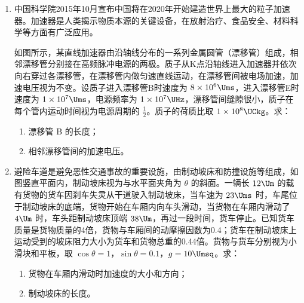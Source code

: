 \documentclass[\gkver]{gaokaozhenti}
\begin{document}
\begin{enumerate}
{\begin{enumerate}
	\item
	Ⅱ．（1）A、C；（2）C；（3）$ka$；$k-R_{2}$。

\end{enumerate}
}

\item
中国科学院2015年10月宣布中国将在2020年开始建造世界上最大的粒子加速器。加速器是人类揭示物质本源的关键设备，在放射治疗、食品安全、材料科学等方面有广泛应用。

如图所示，某直线加速器由沿轴线分布的一系列金属圆管（漂移管）组成，相邻漂移管分别接在高频脉冲电源的两极。质子从K点沿轴线进入加速器并依次向右穿过各漂移管，在漂移管内做匀速直线运动，在漂移管间被电场加速，加速电压视为不变。设质子进入漂移管B时速度为 $8\times10^{6}\Ums$，进入漂移管E时速度为 $1\times10^{7}\Ums$，电源频率为 $1\times10^{7}\UHz$，漂移管间缝隙很小，质子在每个管内运动时间视为电源周期的 $\frac{1}{2}$。质子的荷质比取 $1\times10^{8}\UCkg$。求：
\begin{enumerate}
	\item
	漂移管 B 的长度；
	\item
	相邻漂移管间的加速电压。
\end{enumerate}
\onepicture[align=right, w=5.78cm]{}

\item
避险车道是避免恶性交通事故的重要设施，由制动坡床和防撞设施等组成，如图竖直平面内，制动坡床视为与水平面夹角为 $\theta$ 的斜面。一辆长 $12\Um$ 的载有货物的货车因刹车失灵从干道驶入制动坡床，当车速为 $23\Ums$ 时，车尾位于制动坡床的底端，货物开始在车厢内向车头滑动，当货物在车厢内滑动了 $4\Um$ 时，车头距制动坡床顶端 $38\Um$，再过一段时间，货车停止。已知货车质量是货物质量的4倍，货物与车厢间的动摩擦因数为0.4；货车在制动坡床上运动受到的坡床阻力大小为货车和货物总重的0.44倍。货物与货车分别视为小滑块和平板，取 $\cos\theta=1$，$\sin\theta=0.1$，$g=10\Umsq$。求：
\begin{enumerate}
	\item
	货物在车厢内滑动时加速度的大小和方向；
	\item
	制动坡床的长度。
\end{enumerate}
\onepicture[align=right, w=7.16cm]{}
\end{enumerate}
\end{document}
